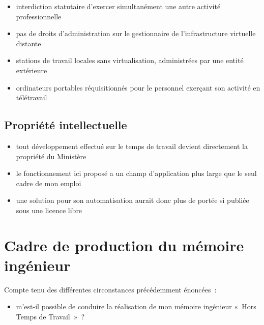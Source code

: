 \documentclass[10pt]{article}
\newenvironment{itmz}{\begin{itemize}
\setlength{\itemsep}{0em}
}{\end{itemize}}
\begin{document}
\begin{itmz}
\item{interdiction statutaire d’exercer simultanément une autre activité professionnelle}
\item{pas de droits d’administration sur le gestionnaire de l’infrastructure virtuelle distante}
\item{stations de travail locales sans virtualisation, administrées par une entité extérieure}
\item{ordinateurs portables réquisitionnés pour le personnel exerçant son activité en télétravail}
\end{itmz}

\subsection{Propriété intellectuelle}

\begin{itmz}
\item{tout développement effectué sur le temps de travail devient directement la propriété du Ministère}
\item{le fonctionnement ici proposé a un champ d’application plus large que le seul cadre de mon emploi}
\item{une solution pour son automatisation aurait donc plus de portée si publiée sous une licence libre}
\end{itmz}

\section{Cadre de production du mémoire ingénieur}

Compte tenu des différentes circonstances précédemment énoncées :
\begin{itmz}
\item{m’est-il possible de conduire la réalisation de mon mémoire ingénieur « Hors Temps de Travail » ?}
\end{itmz}
\end{document}

